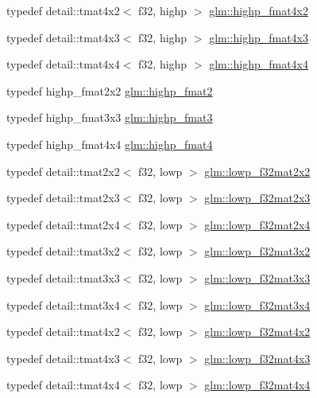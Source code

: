 \begin{CompactItemize}
typedef detail::tmat4x2$<$ f32, highp $>$ \hyperlink{group__gtc__type__precision_gb3d688f05a884be93c647bce2d8a46f4}{glm::highp\_\-fmat4x2}
\item 
typedef detail::tmat4x3$<$ f32, highp $>$ \hyperlink{group__gtc__type__precision_g07f7578fc5a4dd8cdd8a532db25d535f}{glm::highp\_\-fmat4x3}
\item 
typedef detail::tmat4x4$<$ f32, highp $>$ \hyperlink{group__gtc__type__precision_gf0a98d6caffce89da963d3430e05ddb0}{glm::highp\_\-fmat4x4}
\item 
typedef highp\_\-fmat2x2 \hyperlink{group__gtc__type__precision_g10d47be18a81c111a8706d0a6df5b4ea}{glm::highp\_\-fmat2}
\item 
typedef highp\_\-fmat3x3 \hyperlink{group__gtc__type__precision_g3ff9af2eba26aa6df92aa73e1083e81e}{glm::highp\_\-fmat3}
\item 
typedef highp\_\-fmat4x4 \hyperlink{group__gtc__type__precision_g4c7c9823ade7c29e29b5a313949ae502}{glm::highp\_\-fmat4}
\item 
typedef detail::tmat2x2$<$ f32, lowp $>$ \hyperlink{group__gtc__type__precision_ge5beaa9212ba199167c7c7088a70b2bd}{glm::lowp\_\-f32mat2x2}
\item 
typedef detail::tmat2x3$<$ f32, lowp $>$ \hyperlink{group__gtc__type__precision_g7e45acb54ae2e4f5113a05b08eea5812}{glm::lowp\_\-f32mat2x3}
\item 
typedef detail::tmat2x4$<$ f32, lowp $>$ \hyperlink{group__gtc__type__precision_ge0da8e4239df703d44875b49a900c893}{glm::lowp\_\-f32mat2x4}
\item 
typedef detail::tmat3x2$<$ f32, lowp $>$ \hyperlink{group__gtc__type__precision_gdf8ee4630e8d2b6ae72293a7c8dff497}{glm::lowp\_\-f32mat3x2}
\item 
typedef detail::tmat3x3$<$ f32, lowp $>$ \hyperlink{group__gtc__type__precision_g92f4b130a9651c69361600272f113542}{glm::lowp\_\-f32mat3x3}
\item 
typedef detail::tmat3x4$<$ f32, lowp $>$ \hyperlink{group__gtc__type__precision_g7f81032f05c8a1b96b33c328f38c72d3}{glm::lowp\_\-f32mat3x4}
\item 
typedef detail::tmat4x2$<$ f32, lowp $>$ \hyperlink{group__gtc__type__precision_g6eedee3981e5bf150ad7463786d0d694}{glm::lowp\_\-f32mat4x2}
\item 
typedef detail::tmat4x3$<$ f32, lowp $>$ \hyperlink{group__gtc__type__precision_gdd0ff5b09c6ecac83e4e908e3f6478c7}{glm::lowp\_\-f32mat4x3}
\item 
typedef detail::tmat4x4$<$ f32, lowp $>$ \hyperlink{group__gtc__type__precision_gb7a6454e1f5d5c434ff316b139eb0231}{glm::lowp\_\-f32mat4x4}

\end{CompactItemize}
